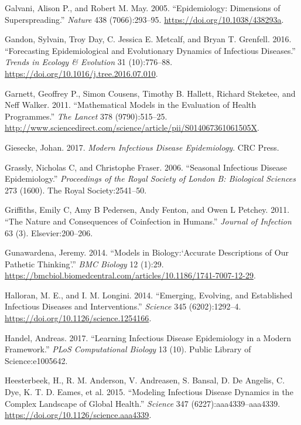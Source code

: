 \documentclass[]{book}
\theoremstyle{definition}
\theoremstyle{definition}
\theoremstyle{definition}
\theoremstyle{remark}
\begin{document}
\leavevmode\hypertarget{ref-galvani05}{}%
Galvani, Alison P., and Robert M. May. 2005. ``Epidemiology: Dimensions
of Superspreading.'' \emph{Nature} 438 (7066):293--95.
\url{https://doi.org/10.1038/438293a}.

\leavevmode\hypertarget{ref-gandon16}{}%
Gandon, Sylvain, Troy Day, C. Jessica E. Metcalf, and Bryan T. Grenfell.
2016. ``Forecasting Epidemiological and Evolutionary Dynamics of
Infectious Diseases.'' \emph{Trends in Ecology \& Evolution} 31
(10):776--88. \url{https://doi.org/10.1016/j.tree.2016.07.010}.

\leavevmode\hypertarget{ref-garnett11}{}%
Garnett, Geoffrey P., Simon Cousens, Timothy B. Hallett, Richard
Steketee, and Neff Walker. 2011. ``Mathematical Models in the Evaluation
of Health Programmes.'' \emph{The Lancet} 378 (9790):515--25.
\url{http://www.sciencedirect.com/science/article/pii/S014067361061505X}.

\leavevmode\hypertarget{ref-giesecke17}{}%
Giesecke, Johan. 2017. \emph{Modern Infectious Disease Epidemiology}.
CRC Press.

\leavevmode\hypertarget{ref-grassly06}{}%
Grassly, Nicholas C, and Christophe Fraser. 2006. ``Seasonal Infectious
Disease Epidemiology.'' \emph{Proceedings of the Royal Society of London
B: Biological Sciences} 273 (1600). The Royal Society:2541--50.

\leavevmode\hypertarget{ref-griffiths11}{}%
Griffiths, Emily C, Amy B Pedersen, Andy Fenton, and Owen L Petchey.
2011. ``The Nature and Consequences of Coinfection in Humans.''
\emph{Journal of Infection} 63 (3). Elsevier:200--206.

\leavevmode\hypertarget{ref-gunawardena14}{}%
Gunawardena, Jeremy. 2014. ``Models in Biology:`Accurate Descriptions of
Our Pathetic Thinking'.'' \emph{BMC Biology} 12 (1):29.
\url{https://bmcbiol.biomedcentral.com/articles/10.1186/1741-7007-12-29}.

\leavevmode\hypertarget{ref-halloran14}{}%
Halloran, M. E., and I. M. Longini. 2014. ``Emerging, Evolving, and
Established Infectious Diseases and Interventions.'' \emph{Science} 345
(6202):1292--4. \url{https://doi.org/10.1126/science.1254166}.

\leavevmode\hypertarget{ref-handel17}{}%
Handel, Andreas. 2017. ``Learning Infectious Disease Epidemiology in a
Modern Framework.'' \emph{PLoS Computational Biology} 13 (10). Public
Library of Science:e1005642.

\leavevmode\hypertarget{ref-heesterbeek15}{}%
Heesterbeek, H., R. M. Anderson, V. Andreasen, S. Bansal, D. De Angelis,
C. Dye, K. T. D. Eames, et al. 2015. ``Modeling Infectious Disease
Dynamics in the Complex Landscape of Global Health.'' \emph{Science} 347
(6227):aaa4339--aaa4339. \url{https://doi.org/10.1126/science.aaa4339}.
\end{document}

